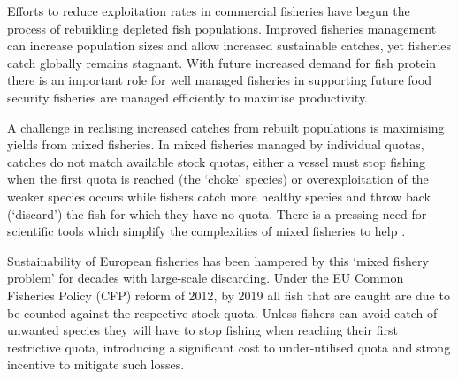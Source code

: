 \documentclass{nature}
\begin{document}
\begin{linenumbers}
 Efforts to reduce exploitation rates in commercial fisheries
have begun the process of rebuilding depleted fish populations\cite{Worm2009}.
Improved fisheries management can increase
population sizes and allow increased sustainable catches, yet fisheries catch
globally remains stagnant\cite{FAO2016}. With future increased demand for fish
protein there is an important role for well managed
fisheries in supporting future food
security\cite{Mcclanahan2015}
fisheries are
managed efficiently to maximise productivity.

A challenge in realising increased catches
from rebuilt populations is maximising yields from mixed
fisheries\cite{Branch2008, Kuriyama2016, Ulrich2016}. In mixed
fisheries managed by
individual quotas,  catches do not match
available stock quotas, either a vessel must stop fishing when the first quota
is reached (the `choke' species) or overexploitation of the weaker species
occurs while fishers  catch more healthy species and throw
back (`discard') the fish for which they have no quota\cite{Batsleer2015}.
There is a pressing need for scientific tools which
simplify the complexities of mixed fisheries to help . 

Sustainability of European fisheries has been hampered by this `mixed fishery
problem' for decades with large-scale discarding\cite{Uhlmann2014}. Under the EU Common Fisheries
Policy (CFP) reform of 2012, by 2019 all fish that are caught are due to be counted against
the respective stock quota.
Unless
fishers can avoid catch of unwanted species they will have to stop fishing when
reaching their first restrictive quota, introducing a
 significant cost to under-utilised
quota\cite{Ulrich2016} and strong incentive to mitigate such
losses\cite{Condie2013}. 


\end{linenumbers}
\end{document}

